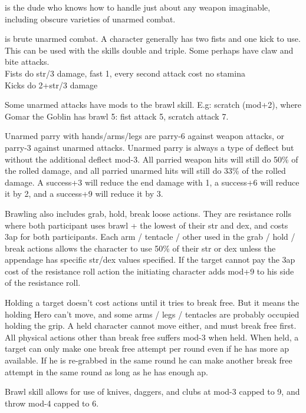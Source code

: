 is the dude who knows how to handle just about any weapon imaginable, including obscure varieties of unarmed combat.


 is brute unarmed combat. A character generally has two fists and one kick to use. This can be used with the skills double and triple. Some perhaps have claw and bite attacks.\\
Fists do str/3 damage, fast 1, every second attack cost no stamina \\
Kicks do 2+str/3 damage

Some unarmed attacks have mods to the brawl skill. E.g: scratch (mod+2), where Gomar the Goblin has brawl 5: fist attack 5, scratch attack 7.

Unarmed parry with hands/arms/legs are parry-6 against weapon attacks, or parry-3 against unarmed attacks. Unarmed parry is always a type of deflect but without the additional deflect mod-3. All parried weapon hits will still do 50\% of the rolled damage, and all parried unarmed hits will still do 33\% of the rolled damage. A success+3 will reduce the end damage with 1, a success+6 will reduce it by 2, and a success+9 will reduce it by 3.

Brawling also includes grab, hold, break loose actions. They are resistance rolls where both participant uses brawl + the lowest of their str and dex, and costs 3ap for both participants.     %
Each arm / tentacle / other used in the grab / hold / break actions allows the character to use 50\% of their str or dex unless the appendage has specific str/dex values specified.
If the target cannot pay the 3ap cost of the resistance roll action the initiating character adds mod+9 to his side of the resistance roll.

Holding a target doesn't cost actions until it tries to break free. But it means the holding Hero can't move, and some arms / legs / tentacles are probably occupied holding the grip. A held character cannot move either, and must break free first. All physical actions other than break free suffers mod-3 when held.
When held, a target can only make one break free attempt per round even if he has more ap available. If he is re-grabbed in the same round he can make another break free attempt in the same round as long as he has enough ap.

Brawl skill allows for use of knives, daggers, and clubs at mod-3 capped to 9, and throw mod-4 capped to 6.


